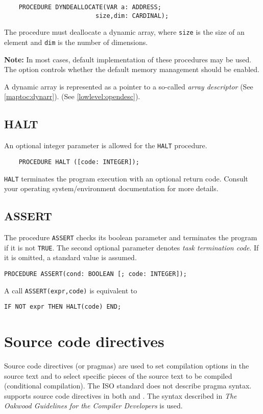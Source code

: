 \begin{verbatim}
    PROCEDURE DYNDEALLOCATE(VAR a: ADDRESS;
                         size,dim: CARDINAL);
\end{verbatim}

The procedure must deallocate a dynamic array,
where \verb|size| is the size of an element and \verb|dim|
is the number of dimensions.

{\bf Note:} In most cases, default implementation of these procedures
may be used. The  option controls whether the default
memory management should be enabled.

A dynamic array is represented as a pointer to a so-called {\it array
descriptor}
\ifgenc (See \ref{maptoc:dynarr}). \fi
\ifgencode (See \ref{lowlevel:opendesc}). \fi

\subsection{HALT}\label{m2:ext:HALT}
\mextonly

An optional integer parameter is allowed for the \verb'HALT' procedure.

\verb'    PROCEDURE HALT ([code: INTEGER]);'

\verb|HALT| terminates the program execution with an optional return code.
Consult your operating system/environment documentation for more details.

\subsection{ASSERT}\label{m2:ext:ASSERT}
\mextonly

The procedure \verb'ASSERT' checks its boolean parameter and terminates
the program if it is not \verb'TRUE'. The second optional parameter
denotes {\em task termination code}. If it is omitted, a standard value
is assumed.

\verb'PROCEDURE ASSERT(cond: BOOLEAN [; code: INTEGER]);'

A call \verb|ASSERT(expr,code)| is equivalent to

\verb'IF NOT expr THEN HALT(code) END;'

\section{Source code directives}\label{m2:pragmas}

Source code directives (or pragmas) are used to set compilation
options in the source text and to select specific pieces of the source
text to be compiled (conditional compilation).
The ISO \mt{} standard does not describe pragma syntax.
\XDS{} supports source code directives
in both \mt{} and \ot{}. The syntax described in
{\em The Oakwood Guidelines for the \ot{} Compiler Developers}
is used.

